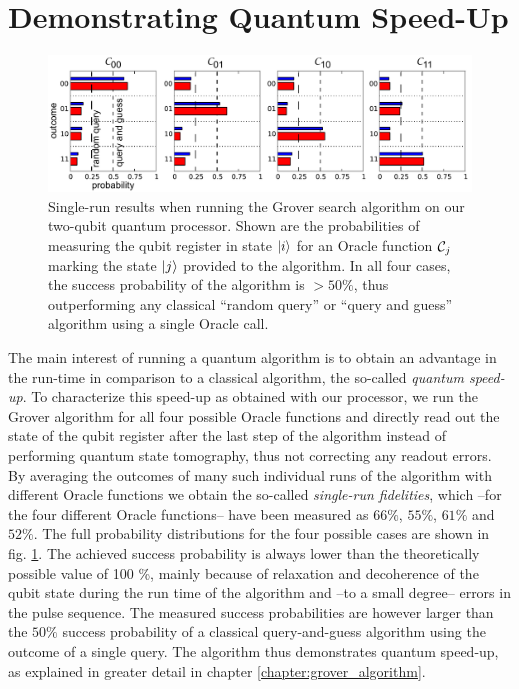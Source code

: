 \section{Demonstrating Quantum Speed-Up}

%
\begin{figure}[ht!]
 \centering \includegraphics[width=1\textwidth]{"./data/ct5/2011_04_21 - grover and tomo/good_data/grover algorithm - single run probabilities"}
\caption[Single-run results of the Grover search algorithm]{Single-run results when running the Grover search algorithm on our
two-qubit quantum processor. Shown are the probabilities of measuring the qubit register in state $\left| i \right>$ for an Oracle function $\Or_j$ marking the state $\left| j \right>$
provided to the algorithm. In all four cases, the success probability
of the algorithm is $>50\%$, thus outperforming any classical ``random query'' or ``query and guess''
algorithm using a single Oracle call.}


\label{fig:grover_single_shot_probabilities} %
\end{figure}


The main interest of running a quantum algorithm is to obtain an advantage
in the run-time in comparison to a classical algorithm, the so-called
\textit{quantum speed-up}. To characterize this speed-up as obtained
with our processor, we run the Grover algorithm for all four possible
Oracle functions and directly read out the state of the qubit register
after the last step of the algorithm instead of performing quantum
state tomography, thus not correcting any readout errors. By averaging
the outcomes of many such individual runs of the algorithm with different
Oracle functions we obtain the so-called \textit{single-run fidelities},
which --for the four different Oracle functions-- have been measured
as $66\%$, $55\%$, $61\%$ and $52\%$. The full probability distributions
for the four possible cases are shown in fig.
\ref{fig:grover_single_shot_probabilities}. The achieved success
probability is always lower than the theoretically possible value
of 100 \%, mainly because of relaxation and decoherence of the qubit
state during the run time of the algorithm and --to a small degree-- errors in the
pulse sequence. The measured success probabilities
are however larger than the $50\%$ success probability of a classical
query-and-guess algorithm using the outcome of a single query. The algorithm thus
demonstrates quantum speed-up, as
explained in greater detail in chapter \ref{chapter:grover_algorithm}. 

